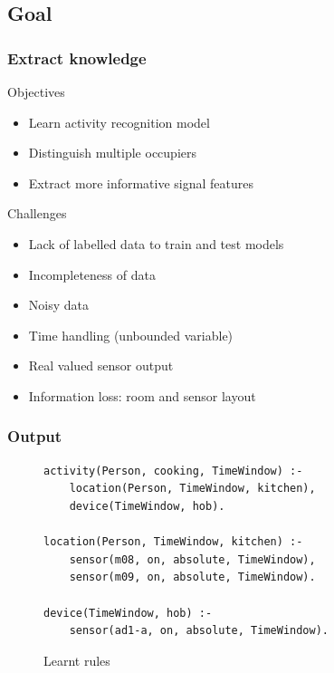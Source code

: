 \documentclass[09pt]{beamer}
\begin{document}
\subsection{Goal}
\begin{frame}
  \frametitle{Extract knowledge}
  \begin{block}{Objectives}
    \begin{itemize}
      \item Learn activity recognition model
      \item Distinguish multiple occupiers
      \item Extract more informative signal features
    \end{itemize}
  \end{block}
  \pause
  \begin{block}{Challenges}
    \begin{itemize}
      \item Lack of labelled data to train and test models
      \item Incompleteness of data
      \item Noisy data
      \item Time handling (unbounded variable)
      \item Real valued sensor output
      \item Information loss: room and sensor layout
    \end{itemize}
  \end{block}
\end{frame}

\begin{frame}[fragile]
\frametitle{Output}
\begin{example}
\begin{figure}
\lstset{
captionpos=b,
language=HTML,
breaklines=true,
float=tb
}
\begin{lstlisting}
activity(Person, cooking, TimeWindow) :-
    location(Person, TimeWindow, kitchen),
    device(TimeWindow, hob).

location(Person, TimeWindow, kitchen) :-
    sensor(m08, on, absolute, TimeWindow),
    sensor(m09, on, absolute, TimeWindow).

device(TimeWindow, hob) :-
    sensor(ad1-a, on, absolute, TimeWindow).
\end{lstlisting}
\caption{Learnt rules\label{lst:rules}}
\end{figure}
\end{example}
\end{frame}  
\end{document}
